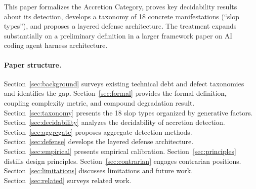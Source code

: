 \documentclass[11pt, a4paper, copyright]{googledeepmind}
\begin{document}
This paper formalizes the Accretion Category, proves key decidability results about its detection, develops a taxonomy of 18 concrete manifestations (``slop types''), and proposes a layered defense architecture. The treatment expands substantially on a preliminary definition in a larger framework paper on AI coding agent harness architecture.

\paragraph{Paper structure.} Section~\ref{sec:background} surveys existing technical debt and defect taxonomies and identifies the gap. Section~\ref{sec:formal} provides the formal definition, coupling complexity metric, and compound degradation result. Section~\ref{sec:taxonomy} presents the 18 slop types organized by generative factors. Section~\ref{sec:decidability} analyzes the decidability of accretion detection. Section~\ref{sec:aggregate} proposes aggregate detection methods. Section~\ref{sec:defense} develops the layered defense architecture. Section~\ref{sec:empirical} presents empirical calibration. Section~\ref{sec:principles} distills design principles. Section~\ref{sec:contrarian} engages contrarian positions. Section~\ref{sec:limitations} discusses limitations and future work. Section~\ref{sec:related} surveys related work.
\end{document}
